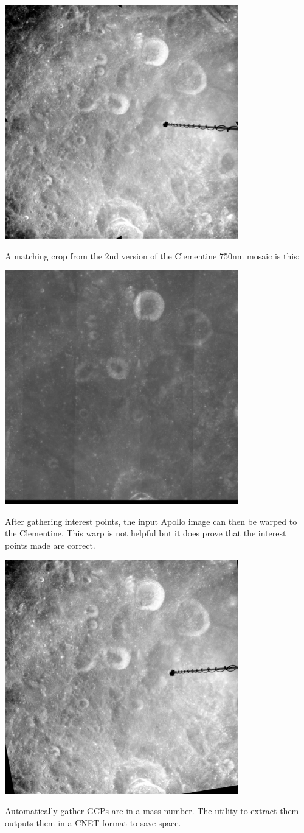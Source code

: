 \documentclass[12pt]{article}
\begin{document}
\includegraphics[width=4in]{images/AS16-M-1192.jpg}

A matching crop from the 2nd version of the Clementine 750nm mosaic is this:

\includegraphics[width=4in]{images/AS16-M-1192_clem.jpg}

After gathering interest points, the input Apollo image can then be
warped to the Clementine. This warp is not helpful but it does prove
that the interest points made are correct.

\includegraphics[width=4in]{images/aligned_AS16-M-1192.jpg}

Automatically gather GCPs are in a mass number. The utility to extract
them outputs them in a CNET format to save space.
\end{document}
